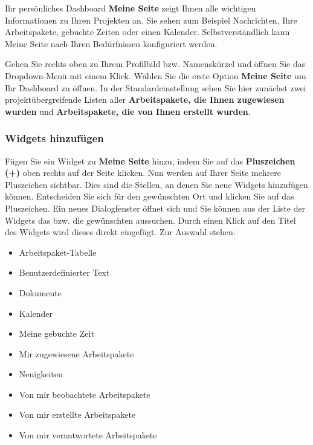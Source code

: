 \documentclass[
  letterpaper,
  DIV=11,
  numbers=noendperiod]{scrreprt}
\providecommand{\tightlist}{%
  \setlength{\itemsep}{0pt}\setlength{\parskip}{0pt}}\usepackage{longtable,booktabs,array}
\begin{document}
Ihr persönliches Dashboard \textbf{Meine Seite} zeigt Ihnen alle
wichtigen Informationen zu Ihren Projekten an. Sie sehen zum Beispiel
Nachrichten, Ihre Arbeitspakete, gebuchte Zeiten oder einen Kalender.
Selbstverständlich kann Meine Seite nach Ihren Bedürfnissen konfiguriert
werden.

Gehen Sie rechts oben zu Ihrem Profilbild bzw. Namenskürzel und öffnen
Sie das Dropdown-Menü mit einem Klick. Wählen Sie die erste Option
\textbf{Meine Seite} um Ihr Dashboard zu öffnen. In der
Standardeinstellung sehen Sie hier zunächst zwei projektübergreifende
Listen aller \textbf{Arbeitspakete, die Ihnen zugewiesen wurden} und
\textbf{Arbeitspakete, die von Ihnen erstellt wurden}.

\subsubsection{Widgets hinzufügen}\label{widgets-hinzufuxfcgen}

Fügen Sie ein Widget zu \textbf{Meine Seite} hinzu, indem Sie auf das
\textbf{Pluszeichen (+)} oben rechts auf der Seite klicken. Nun werden
auf Ihrer Seite mehrere Pluszeichen sichtbar. Dies sind die Stellen, an
denen Sie neue Widgets hinzufügen können. Entscheiden Sie sich für den
gewünschten Ort und klicken Sie auf das Pluszeichen. Ein neues
Dialogfenster öffnet sich und Sie können aus der Liste der Widgets das
bzw. die gewünschten aussuchen. Durch einen Klick auf den Titel des
Widgets wird dieses direkt eingefügt. Zur Auswahl stehen:

\begin{itemize}
\tightlist
\item
  Arbeitspaket-Tabelle
\item
  Benutzerdefinierter Text
\item
  Dokumente
\item
  Kalender
\item
  Meine gebuchte Zeit
\item
  Mir zugewiesene Arbeitspakete
\item
  Neuigkeiten
\item
  Von mir beobachtete Arbeitspakete
\item
  Von mir erstellte Arbeitspakete
\item
  Von mir verantwortete Arbeitspakete
\end{itemize}
\end{document}
